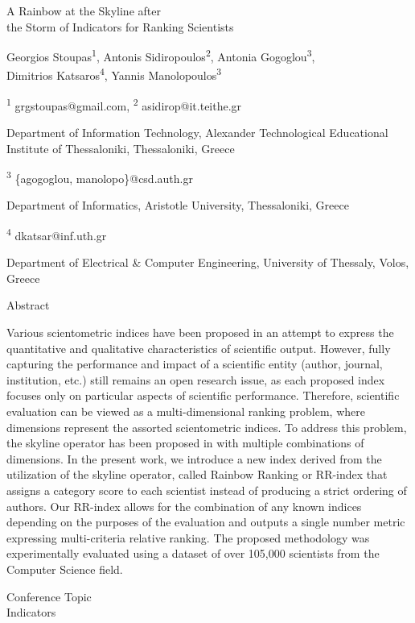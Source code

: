 A Rainbow at the Skyline after\\
the Storm of Indicators for Ranking Scientists

Georgios Stoupas\textsuperscript{1}, Antonis
Sidiropoulos\textsuperscript{2}, Antonia Gogoglou\textsuperscript{3},\\
Dimitrios Katsaros\textsuperscript{4}, Yannis
Manolopoulos\textsuperscript{3}

\textsuperscript{1} grgstoupas@gmail.com, \textsuperscript{2}
asidirop@it.teithe.gr

Department of Information Technology, Alexander Technological
Educational Institute of Thessaloniki, Thessaloniki, Greece

\textsuperscript{3} \{agogoglou, manolopo\}@csd.auth.gr

Department of Informatics, Aristotle University, Thessaloniki, Greece

\textsuperscript{4} dkatsar@inf.uth.gr

Department of Electrical \& Computer Engineering, University of
Thessaly, Volos, Greece

Abstract

Various scientometric indices have been proposed in an attempt to
express the quantitative and qualitative characteristics of scientific
output. However, fully capturing the performance and impact of a
scientific entity (author, journal, institution, etc.) still remains an
open research issue, as each proposed index focuses only on particular
aspects of scientific performance. Therefore, scientific evaluation can
be viewed as a multi-dimen­sional ranking problem, where dimensions
represent the assorted scientometric indices. To address this problem,
the skyline operator has been proposed in with multiple combinations of
dimensions. In the present work, we introduce a new index derived from
the utilization of the skyline operator, called Rainbow Ranking or
RR-index that assigns a category score to each scientist instead of
producing a strict ordering of authors. Our RR-index allows for the
combination of any known indices depending on the purposes of the
evaluation and outputs a single number metric expressing multi-criteria
relative ranking. The proposed methodology was experimentally evaluated
using a dataset of over 105,000 scientists from the Computer Science
field.

Conference Topic\\
Indicators